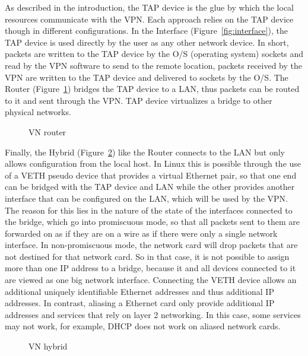 As described in the introduction, the TAP device is the glue by which the local
resources communicate with the VPN.  Each approach relies on the TAP device
though in different configurations.  In the Interface
(Figure~\ref{fig:interface}), the TAP device is used directly by the user as
any other network device.  In short, packets are written to the TAP device by
the O/S (operating system) sockets and read by the VPN software to send to the
remote location, packets received by the VPN are written to the TAP device and
delivered to sockets by the O/S.  The Router (Figure~\ref{fig:router}) bridges
the TAP device to a LAN, thus packets can be routed to it and sent through the
VPN.  TAP device virtualizes a bridge to other physical networks.  

\begin{figure}
\centering
{}
\caption{VN router}
\label{fig:router}
\end{figure}

Finally, the Hybrid (Figure~\ref{fig:hybrid}) like the Router connects to the
LAN but only allows configuration from the local host.  In Linux this is
possible through the use of a VETH pseudo device that provides a virtual
Ethernet pair, so that one end can be bridged with the TAP device and LAN while
the other provides another interface that can be configured on the LAN, which
will be used by the VPN.  The reason for this lies in the nature of the state
of the interfaces connected to the bridge, which go into promiscuous mode, so
that all packets sent to them are forwarded on as if they are on a wire as if
there were only a single network interface.  In non-promiscuous mode, the
network card will drop packets that are not destined for that network card.  So
in that case, it is not possible to assign more than one IP address to a
bridge, because it and all devices connected to it are viewed as one big
network interface.  Connecting the VETH device allows an additional uniquely
identifiable Ethernet addresses and thus additional IP addresses.  In contrast,
aliasing a Ethernet card only provide additional IP addresses and services that
rely on layer 2 networking. In this case, some services may not work, for
example, DHCP does not work on aliased network cards.

\begin{figure}
\centering
{}
\caption{VN hybrid}
\label{fig:hybrid}
\end{figure}


